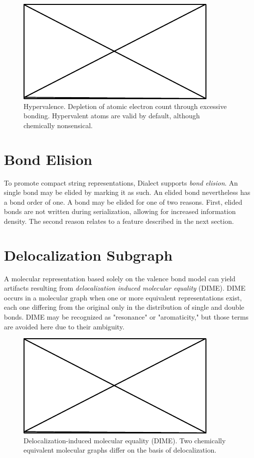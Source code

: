 \documentclass{article}
\begin{document}
\begin{figure}
    \centering
    \includegraphics{filler}
    \caption{Hypervalence. Depletion of atomic electron count through excessive bonding. Hypervalent atoms are valid by default, although chemically nonsensical.}
    \label{fig:hypervalence}
\end{figure}

\section*{Bond Elision}

To promote compact string representations, Dialect supports \textit{bond elision}. An single bond may be elided by marking it as such. An elided bond nevertheless has a bond order of one. A bond may be elided for one of two reasons. First, elided bonds are not written during serialization, allowing for increased information density. The second reason relates to a feature described in the next section.

\section*{Delocalization Subgraph}

A molecular representation based solely on the valence bond model can yield artifacts resulting from \textit{delocalization induced molecular equality} (DIME). DIME occurs in a molecular graph when one or more equivalent representations exist, each one differing from the original only in the distribution of single and double bonds. DIME may be recognized as "resonance" or "aromaticity," but those terms are avoided here due to their ambiguity.\cite{randic2018,kerber2006}

\begin{figure}
    \centering
    \includegraphics{filler}
    \caption{Delocalization-induced molecular equality (DIME). Two chemically equivalent molecular graphs differ on the basis of delocalization.}
    \label{fig:dime}
\end{figure}
\end{document}

